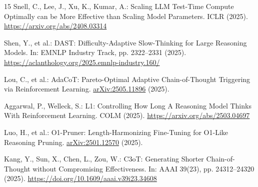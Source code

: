 \documentclass[a4paper,runningheads]{llncs}
\begin{document}
\begin{thebibliography}{15}
Snell, C., Lee, J., Xu, K., Kumar, A.: Scaling LLM Test-Time Compute Optimally can be More Effective than Scaling Model Parameters. ICLR (2025). \url{https://arxiv.org/abs/2408.03314}

Shen, Y., et al.: DAST: Difficulty-Adaptive Slow-Thinking for Large Reasoning Models. In: EMNLP Industry Track, pp. 2322--2331 (2025). \url{https://aclanthology.org/2025.emnlp-industry.160/}

Lou, C., et al.: AdaCoT: Pareto-Optimal Adaptive Chain-of-Thought Triggering via Reinforcement Learning. \href{https://arxiv.org/abs/2505.11896}{arXiv:2505.11896} (2025).

Aggarwal, P., Welleck, S.: L1: Controlling How Long A Reasoning Model Thinks With Reinforcement Learning. COLM (2025). \url{https://arxiv.org/abs/2503.04697}

Luo, H., et al.: O1-Pruner: Length-Harmonizing Fine-Tuning for O1-Like Reasoning Pruning. \href{https://arxiv.org/abs/2501.12570}{arXiv:2501.12570} (2025).

Kang, Y., Sun, X., Chen, L., Zou, W.: C3oT: Generating Shorter Chain-of-Thought without Compromising Effectiveness. In: AAAI 39(23), pp. 24312--24320 (2025). \url{https://doi.org/10.1609/aaai.v39i23.34608}

\end{thebibliography}
\end{document}
